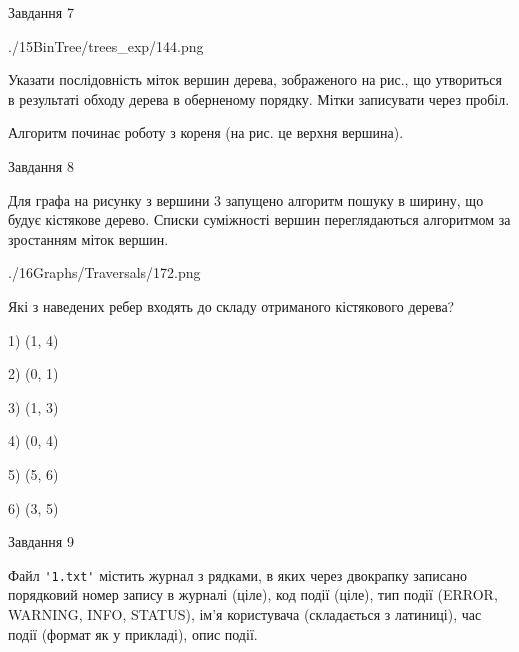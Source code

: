 \documentclass[12pt, ukrainian]{article}
\def\code#1{\Verb!#1!}
\begin{document}
{\vspace{10mm}\par

\newpage
\begin{minipage}[t]{9.7cm}
               
{\begin{center}Завдання {7}\end{center}}
\vspace{-6mm}

\begin{center}
	{./15BinTree/trees_exp/144.png}
\end{center}
Указати послідовність міток вершин дерева, зображеного на рис., що утвориться в результаті обходу дерева в оберненому порядку. Мітки записувати через пробіл.\par Алгоритм починає роботу з кореня (на рис. це верхня вершина).\par

\end{minipage}
\vline \hspace{8mm}
\begin{minipage}[t]{8.0cm}
               
{\begin{center}Завдання {8}\end{center}}
\vspace{-6mm}
Для графа на рисунку з вершини 3 запущено алгоритм пошуку в ширину, що будує кістякове дерево. Списки суміжності вершин переглядаються алгоритмом за зростанням міток вершин.\par
\begin{center}
	{./16Graphs/Traversals/172.png}
\end{center}
\par Які з наведених ребер входять до складу отриманого кістякового дерева?\par
1) (1, 4)\par
2) (0, 1)\par
3) (1, 3)\par
4) (0, 4)\par
5) (5, 6)\par
6) (3, 5)\par
{\vskip 15pt} \par

\end{minipage}

               
{\begin{center}Завдання {9}\end{center}}
\vspace{-6mm}
Файл \code{'1.txt'} містить журнал з рядками, в яких через двокрапку записано поряд\-ко\-вий номер запису в журналі (ціле), код події (ціле), тип події (ERROR, \\WARNING, INFO, STATUS), ім'я користувача (складається з латиниці), час події (фор\-мат як у прикладі), опис події.

}
\end{document}
